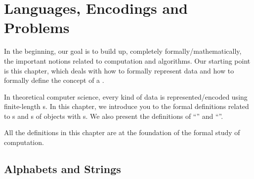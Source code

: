 
\chapter{Languages, Encodings and Problems}
\label{chapter:Languages-Encodings-and-Problems}

\begin{preamble}
In the beginning, our goal is to build up, completely formally/mathematically, the important notions related to computation and algorithms. Our starting point is this chapter, which deals with how to formally represent data and how to formally define the concept of a .

In theoretical computer science, every kind of data is represented/encoded using finite-length s. In this chapter, we introduce you to the formal definitions related to s and s of objects with s. We also present the definitions of ``'' and ``''. 

All the definitions in this chapter are at the foundation of the formal study of computation.
\end{preamble}



\section{Alphabets and Strings}
\label{section:Alphabets-and-Strings}


